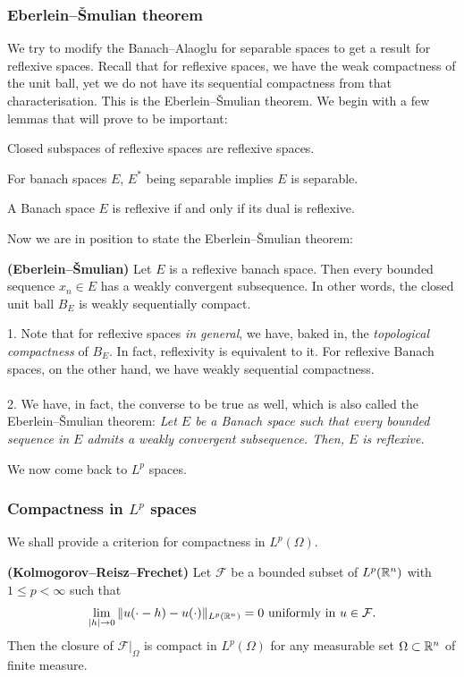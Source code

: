 \subsubsection{Eberlein--Šmulian theorem}
We try to modify the Banach--Alaoglu for separable spaces to get a result for reflexive spaces. Recall that for reflexive spaces, we have the weak compactness of the unit ball, yet we do not have its sequential compactness from that characterisation. This is the Eberlein--Šmulian theorem. We begin with a few lemmas that will prove to be important: 
\begin{lemma}
    Closed subspaces of reflexive spaces are reflexive spaces.
\end{lemma}
\begin{lemma}
    For banach spaces $E$, $E^*$ being separable implies $E$ is separable.
\end{lemma}
\begin{lemma}
    A Banach space $E$ is reflexive if and only if its dual is reflexive.
\end{lemma}
Now we are in position to state the Eberlein--Šmulian theorem: 
\begin{theorem}
    \textbf{(Eberlein--Šmulian)} Let $E$ is a reflexive banach space. Then every bounded sequence $x_n\in E$ has a weakly convergent subsequence. In other words, the closed unit ball $B_{E}$ is weakly sequentially compact.
\end{theorem}
\begin{remark}
1. Note that for reflexive spaces \emph{in general}, we have, baked in, the \emph{topological compactness} of $B_{E}$. In fact, reflexivity is equivalent to it. For reflexive Banach spaces, on the other hand, we have weakly sequential compactness.
\\\\ 2. We have, in fact, the converse to be true as well, which is also called the Eberlein--Šmulian theorem: 
\emph{Let $E$ be a Banach space such that every bounded sequence in $E$ admits a weakly convergent subsequence. Then, $E$ is reflexive.}

\end{remark}
We now come back to $L^p$ spaces.
\subsubsection{Compactness in $L^p$ spaces}
We shall provide a criterion for compactness in $L^p(\Omega)$.
\begin{theorem}
    \textbf{(Kolmogorov--Reisz--Frechet)} Let $\mathcal F$ be a bounded subset of $L^p(\mathbb{R}^n)$ with $1\leq p<\infty$ such that $$\lim_{|h|\to 0} \|u(\cdot - h)-u(\cdot)\|_{L^p(\mathbb{R}^n)}=0 \text{ uniformly in }u\in \mathcal F. $$ Then the closure of $\mathcal F|_{\Omega}$ is compact in $L^p(\Omega)$ for any measurable set $\Omega\subset \mathbb{R}^n$ of finite measure. 
\end{theorem}

